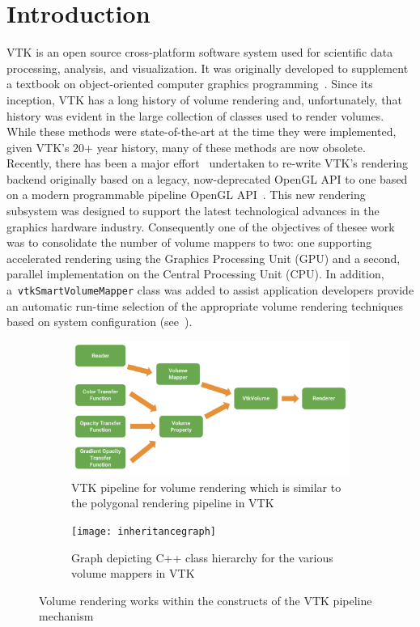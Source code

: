 \section{Introduction}
\label{introduction}
VTK is an open source cross-platform software system used for scientific data
processing, analysis, and visualization. It was originally developed to
supplement a textbook on object-oriented computer graphics
programming~\citep{schroeder_visualization_2006, geveci_vtk_2012}.  Since its
inception, VTK has a long history of volume rendering and, unfortunately, that
history was evident in the large collection of classes used to render volumes.
While these methods were state-of-the-art at the time they were implemented,
given VTK's 20+ year history, many of these methods are now obsolete. Recently,
there has been a major effort~\citep{hanwell_visualization_2015} undertaken to
re-write VTK's rendering backend originally based on a legacy, now-deprecated
OpenGL API to one based on a modern programmable pipeline OpenGL
API~\citep{shreiner_opengl_2013}. This new rendering subsystem was designed to
support the latest technological advances in the graphics hardware industry.
Consequently one of the objectives of thesee work was to consolidate the number of
volume mappers to two: one supporting accelerated rendering using the Graphics
Processing Unit (GPU) and a second, parallel implementation on the Central
Processing Unit (CPU). In addition, a~\texttt{vtkSmartVolumeMapper} class was
added to assist application developers  provide an automatic run-time selection of
the appropriate volume rendering techniques based on system configuration
(see~).

\begin{figure}
  \centering
  \begin{subfigure}[b]{\columnwidth}
    \centering
    \includegraphics[width=\columnwidth, height=0.4\textheight]{vtk_volume_pipeline}
    \caption{VTK pipeline for volume rendering which is similar to the polygonal
      rendering pipeline in VTK}
    \label{fig:pipeline}
  \end{subfigure}\vfill
  \begin{subfigure}[b]{\columnwidth}
    \centering
    \texttt{[image: inheritancegraph]}
    \caption{Graph depicting C++ class hierarchy for
      the various volume mappers in VTK}
    \label{fig:inheritancegraph}
  \end{subfigure}
  \caption{Volume rendering works within the constructs of the VTK pipeline
    mechanism}
  \label{fig:pipeline-inheritancegraph}
\end{figure}

